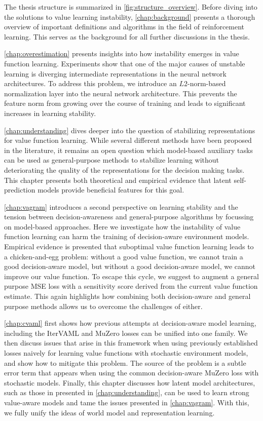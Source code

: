 The thesis structure is summarized in \autoref{fig:structure_overview}.
Before diving into the solutions to value learning instability, \autoref{chap:background} presents a thorough overview of important definitions and algorithms in the field of reinforcement learning.
This serves as the background for all further discussions in the thesis.


\autoref{chap:overestimation} presents insights into how instability emerges in value function learning.
Experiments show that one of the major causes of unstable learning is diverging intermediate representations in the neural network architectures.
To address this problem, we introduce an $L2$-norm-based normalization layer into the neural network architecture.
This prevents the feature norm from growing over the course of training and leads to significant increases in learning stability.

\autoref{chap:understanding} dives deeper into the question of stabilizing representations for value function learning.
While several different methods have been proposed in the literature, it remains an open question which model-based auxiliary tasks can be used as general-purpose methods to stabilize learning without deteriorating the quality of the representations for the decision making tasks.
This chapter presents both theoretical and empirical evidence that latent self-prediction models provide beneficial features for this goal.

\autoref{chap:vagram} introduces a second perspective on learning stability and the tension between decision-awareness and general-purpose algorithms by focussing on model-based approaches.
Here we investigate how the instability of value function learning can harm the training of decision-aware environment models.
Empirical evidence is presented that suboptimal value function learning leads to a chicken-and-egg problem: without a good value function, we cannot train a good decision-aware model, but without a good decision-aware model, we cannot improve our value function.
To escape this cycle, we suggest to augment a general purpose MSE loss with a sensitivity score derived from the current value function estimate.
This again highlights how combining both decision-aware and general purpose methods allows us to overcome the challenges of either.

\autoref{chap:cvaml} first shows how previous attempts at decision-aware model learning, including the IterVAML \parencite{itervaml} and MuZero \parencite{schrittwieser2020mastering} losses can be unified into one family. 
We then discuss issues that arise in this framework when using previously established losses naively for learning value functions with stochastic environment models, and show how to mitigate this problem.
The source of the problem is a subtle error term that appears when using the common decision-aware MuZero loss with stochastic models.
Finally, this chapter discusses how latent model architectures, such as those in presented in \autoref{chap:understanding}, can be used to learn strong value-aware models and tame the issues presented in \autoref{chap:vagram}.
With this, we fully unify the ideas of world model and representation learning.

